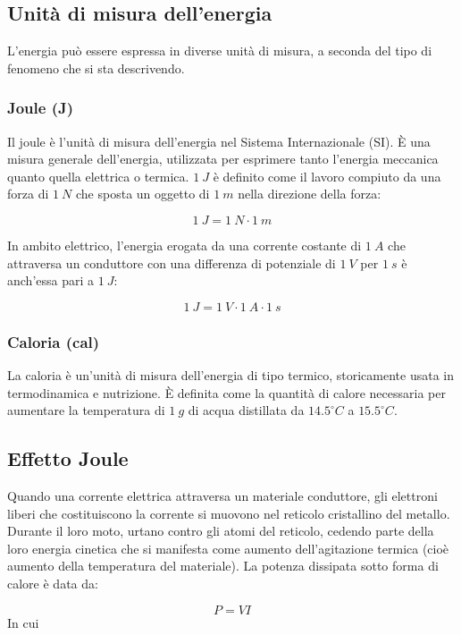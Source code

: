 \subsection{Unità di misura dell'energia}
L'energia può essere espressa in diverse unità di misura, a seconda del tipo di fenomeno che si sta descrivendo.
\subsubsection{Joule (J)}
Il joule è l'unità di misura dell'energia nel Sistema Internazionale (SI). È una misura generale dell'energia, utilizzata per esprimere tanto l'energia meccanica quanto quella elettrica o termica. $1\ J$ è definito come il lavoro compiuto da una forza di $1\ N$ che sposta un oggetto di $1\ m$ nella direzione della forza:

\begin{equation}
	1\ J=1\ N\cdot 1\ m
\end{equation}

In ambito elettrico, l'energia erogata da una corrente costante di $1\ A$ che attraversa un conduttore con una differenza di potenziale di $1\ V$ per $1\ s$ è anch'essa pari a $1\ J$:

\begin{equation}
	1\ J=1\ V\cdot 1\ A\cdot 1\ s
\end{equation}

\subsubsection{Caloria (cal)}
La caloria è un'unità di misura dell'energia di tipo termico, storicamente usata in termodinamica e nutrizione. È definita come la quantità di calore necessaria per aumentare la temperatura di $1\ g$ di acqua distillata da $14.5^{\circ}C$ a $15.5^{\circ}C$.


\subsection{Effetto Joule}
Quando una corrente elettrica attraversa un materiale conduttore, gli elettroni liberi che costituiscono la corrente si muovono nel reticolo cristallino del metallo. Durante il loro moto, urtano contro gli atomi del reticolo, cedendo parte della loro energia cinetica che si manifesta come aumento dell'agitazione termica (cioè aumento della temperatura del materiale). La potenza dissipata sotto forma di calore è data da:

\begin{equation}
	P = VI
\end{equation}
In cui

